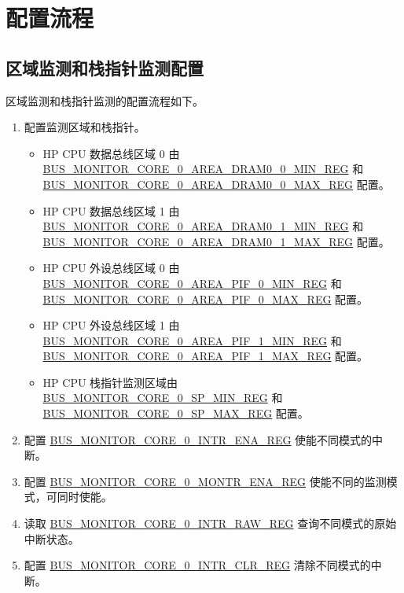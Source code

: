 \documentclass[main\_\_CN.tex]{subfiles}
\begin{document}
\section{配置流程}
\label{sec:dbgassist-prog-procedures}

\subsection{区域监测和栈指针监测配置}

区域监测和栈指针监测的配置流程如下。

\begin{enumerate}
    \item 配置监测区域和栈指针。
        \begin{itemize}
            \item HP CPU 数据总线区域 0 由 \hyperref[regdesc:BUSMONITORCORE0AREADRAM00MINREG]{BUS\_MONITOR\_CORE\_0\_AREA\_DRAM0\_0\_MIN\_REG} 和 \hyperref[regdesc:BUSMONITORCORE0AREADRAM00MAXREG]{BUS\_MONITOR\_CORE\_0\_AREA\_DRAM0\_0\_MAX\_REG} 配置。
            \item HP CPU 数据总线区域 1 由 \hyperref[regdesc:BUSMONITORCORE0AREADRAM01MINREG]{BUS\_MONITOR\_CORE\_0\_AREA\_DRAM0\_1\_MIN\_REG} 和 \hyperref[regdesc:BUSMONITORCORE0AREADRAM01MAXREG]{BUS\_MONITOR\_CORE\_0\_AREA\_DRAM0\_1\_MAX\_REG} 配置。
            \item HP CPU 外设总线区域 0 由 \hyperref[regdesc:BUSMONITORCORE0AREAPIF0MINREG]{BUS\_MONITOR\_CORE\_0\_AREA\_PIF\_0\_MIN\_REG} 和 \hyperref[regdesc:BUSMONITORCORE0AREAPIF0MAXREG]{BUS\_MONITOR\_CORE\_0\_AREA\_PIF\_0\_MAX\_REG} 配置。
            \item HP CPU 外设总线区域 1 由 \hyperref[regdesc:BUSMONITORCORE0AREAPIF1MINREG]{BUS\_MONITOR\_CORE\_0\_AREA\_PIF\_1\_MIN\_REG} 和 \hyperref[regdesc:BUSMONITORCORE0AREAPIF1MAXREG]{BUS\_MONITOR\_CORE\_0\_AREA\_PIF\_1\_MAX\_REG} 配置。
            \item HP CPU 栈指针监测区域由 \hyperref[regdesc:BUSMONITORCORE0SPMINREG]{BUS\_MONITOR\_CORE\_0\_SP\_MIN\_REG} 和 \hyperref[regdesc:BUSMONITORCORE0SPMAXREG]{BUS\_MONITOR\_CORE\_0\_SP\_MAX\_REG} 配置。
        \end{itemize}
    \item 配置 \hyperref[regdesc:BUSMONITORCORE0INTRENAREG]{BUS\_MONITOR\_CORE\_0\_INTR\_ENA\_REG} 使能不同模式的中断。
    \item 配置 \hyperref[regdesc:BUSMONITORCORE0MONTRENAREG]{BUS\_MONITOR\_CORE\_0\_MONTR\_ENA\_REG} 使能不同的监测模式，可同时使能。
    \item 读取 \hyperref[regdesc:BUSMONITORCORE0INTRRAWREG]{BUS\_MONITOR\_CORE\_0\_INTR\_RAW\_REG} 查询不同模式的原始中断状态。
    \item 配置 \hyperref[regdesc:BUSMONITORCORE0INTRCLRREG]{BUS\_MONITOR\_CORE\_0\_INTR\_CLR\_REG} 清除不同模式的中断。
\end{enumerate}
\end{document}
